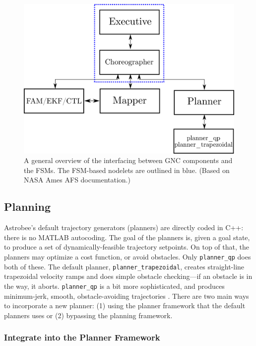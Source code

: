 \documentclass{article}
\begin{document}
\begin{figure}[h!]
	\centering
	\includegraphics[width=1.0\textwidth]{img/fsm.png}
	\caption{A general overview of the interfacing between GNC components and the FSMs. The FSM-based nodelets are outlined in blue. (Based on NASA Ames AFS documentation.)}
	\label{fig:FSMs}
\end{figure}

\subsection{Planning}
\label{sec:plan}
Astrobee's default trajectory generators (planners) are directly coded in C++: there is no MATLAB autocoding. The goal of the planners is, given a goal state, to produce a set of dynamically-feasible trajectory setpoints. On top of that, the planners may optimize a cost function, or avoid obstacles. Only \texttt{planner\_qp} does both of these. The default planner, \texttt{planner\_trapezoidal}, creates straight-line trapezoidal velocity ramps and does simple obstacle checking---if an obstacle is in the way, it aborts. \texttt{planner\_qp} is a bit more sophisticated, and produces minimum-jerk, smooth, obstacle-avoiding trajectories \cite{Watterson2016}. There are two main ways to incorporate a new planner: (1) using the planner framework that the default planners uses or (2) bypassing the planning framework.

\subsubsection{Integrate into the Planner Framework}
\end{document}
